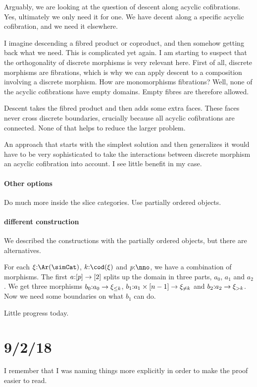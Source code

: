 \documentclass[csh.tex]{subfiles}
\begin{document}
Arguably, we are looking at the question of descent along acyclic cofibrations. Yes, ultimately we only need it for one. We have decent along a specific acyclic cofibration, and we need it elsewhere.

I imagine descending a fibred product or coproduct, and then somehow getting back what we need. This is complicated yet again.
I am starting to suspect that the orthogonality of discrete morphisms is very relevant here. First of all, discrete morphisms are fibrations, which is why we can apply descent to a composition involving a discrete morphism. How are monomorphisms fibrations? Well, none of the acyclic cofibrations have empty domains. Empty fibres are therefore allowed.

Descent takes the fibred product and then adds some extra faces. These faces never cross discrete boundaries, crucially because all acyclic cofibrations are connected. None of that helps to reduce the larger problem.

An approach that starts with the simplest solution and then generalizes it would have to be very sophisticated to take the interactions between discrete morphism an acyclic cofibration into account. I see little benefit in my case.

\paragraph{Other options}
Do much more inside the slice categories.
Use partially ordered objects.

\paragraph{different construction}
We described the constructions with the partially ordered objects, but there are alternatives.

For each $\xi\of\Ar(\simCat)$, $k\of \cod(\xi)$ and $p\of\nno$, we have a combination of morphisms. The first $a\mathord :[p]\to[2]$ splits up the domain in three parts, $a_0$, $a_1$ and $a_2$. 
We get three morphisms $b_0\mathord : a_0 \to \xi_{\leq k}$, $b_1\mathord : a_1\times[n-1]\to \xi_{\neq k}$ and $b_2\mathord : a_2\to\xi_{>k}$. Now we need some boundaries on what $b_1$ can do. 
 
Little progress today.

\section{9/2/18}
I remember that I was naming things more explicitly in order to make the proof easier to read.
\end{document}
